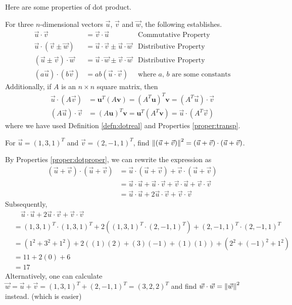 Here are some properties of dot product.
\begin{proper}
\label{proper:dotproper}
For three $n$-dimensional vectors $\vec{u}$, $\vec{v}$ and $\vec{w}$, the following establishes.
\begin{align*}
\vec{u} \cdot \vec{v} &= \vec{v} \cdot \vec{u} &\text{Commutative Property} \\
\vec{u} \cdot (\vec{v} \pm \vec{w}) &= \vec{u} \cdot \vec{v} \pm \vec{u} \cdot \vec{w} &\text{Distributive Property} \\
(\vec{u} \pm \vec{v}) \cdot \vec{w} &= \vec{u} \cdot \vec{w} \pm \vec{v} \cdot \vec{w} &\text{Distributive Property} \\
(a\vec{u}) \cdot (b\vec{v}) &= ab(\vec{u} \cdot \vec{v}) &\text{where $a$, $b$ are some constants}
\end{align*}
Additionally, if $A$ is an $n \times n$ square matrix, then
\begin{align*}
\vec{u} \cdot (A\vec{v}) &= \textbf{u}^T(A\textbf{v}) = (A^T\textbf{u})^T\textbf{v} = (A^T\vec{u}) \cdot \vec{v} \\
(A\vec{u}) \cdot \vec{v} &= (A\textbf{u})^T\textbf{v} = \textbf{u}^T(A^T\textbf{v}) = \vec{u} \cdot (A^T\vec{v})
\end{align*}
where we have used Definition \ref{defn:dotreal} and Properties \ref{proper:transp}.
\end{proper}
\begin{exmp}
For $\vec{u} = (1,3,1)^T$ and $\vec{v} = (2,-1,1)^T$, find $\norm{(\vec{u} + \vec{v})}^2 = (\vec{u} + \vec{v}) \cdot (\vec{u} + \vec{v})$.
\end{exmp}
\begin{solution}
By Properties \ref{proper:dotproper}, we can rewrite the expression as
\begin{align*}
(\vec{u} + \vec{v}) \cdot (\vec{u} + \vec{v}) &= \vec{u} \cdot (\vec{u} + \vec{v}) + \vec{v} \cdot (\vec{u} + \vec{v}) \\
&= \vec{u} \cdot \vec{u} + \vec{u} \cdot \vec{v} + \vec{v} \cdot \vec{u} + \vec{v} \cdot \vec{v} \\
&= \vec{u} \cdot \vec{u} + 2 \vec{u} \cdot \vec{v} + \vec{v} \cdot \vec{v}
\end{align*}
Subsequently,
\begin{align*}
&\quad \vec{u} \cdot \vec{u} + 2 \vec{u} \cdot \vec{v} + \vec{v} \cdot \vec{v} \\
&= (1,3,1)^T \cdot (1,3,1)^T + 2((1,3,1)^T \cdot (2,-1,1)^T) + (2,-1,1)^T \cdot (2,-1,1)^T \\
&= (1^2 + 3^2 + 1^2) + 2((1)(2)+(3)(-1)+(1)(1)) + (2^2 + (-1)^2 + 1^2) \\
&= 11 + 2(0) + 6 \\
&= 17
\end{align*}
Alternatively, one can calculate $\vec{w} = \vec{u} + \vec{v} = (1,3,1)^T + (2,-1,1)^T = (3,2,2)^T$ and find $\vec{w} \cdot \vec{w} = \norm{\vec{w}}^2$ instead. (which is easier)
\end{solution}
